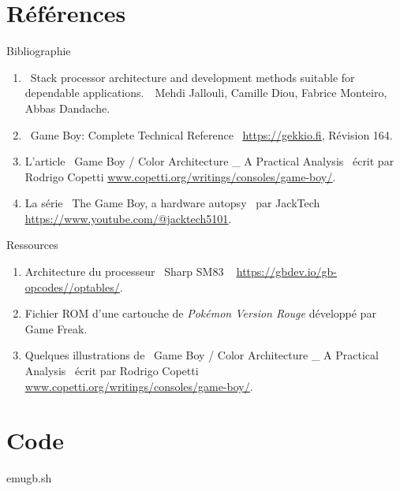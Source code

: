 \documentclass{beamer}
\begin{document}
    \appendix
    \section{Références}
    \begin{frame}{Bibliographie}
        \begin{enumerate}
            \item \guillemotleft\ Stack processor architecture and development methods suitable for dependable
applications.\ \guillemotright\ Mehdi Jallouli, Camille Diou, Fabrice Monteiro, Abbas Dandache.
            \item \guillemotleft\ Game Boy: Complete Technical Reference \guillemotright\ {\color{blue}\underline{\url{https://gekkio.fi}}}, Révision 164.
            \item L'article \guillemotleft\ Game Boy / Color Architecture \_ A Practical Analysis \guillemotright\ écrit par Rodrigo Copetti {\color{blue} \underline{\href{https://www.copetti.org/writings/consoles/game-boy/}{www.copetti.org/writings/consoles/game-boy/}}}.
            \item La série \guillemotleft\ The Game Boy, a hardware autopsy \guillemotright\ par JackTech {\color{blue} \underline{\url{https://www.youtube.com/@jacktech5101}}}.
        \end{enumerate}
    \end{frame}

    \begin{frame}{Ressources}
        \begin{enumerate}
            \item Architecture du processeur \guillemotleft\ Sharp SM83 \guillemotright\ {\color{blue} \underline{\url{https://gbdev.io/gb-opcodes//optables/}}}.
            \item Fichier ROM d'une cartouche de \textit{Pokémon Version Rouge} développé par Game Freak.
            \item Quelques illustrations de \guillemotleft\ Game Boy / Color Architecture \_ A Practical Analysis \guillemotright\ écrit par Rodrigo Copetti {\color{blue} \underline{\href{https://www.copetti.org/writings/consoles/game-boy/}{www.copetti.org/writings/consoles/game-boy/}}}.
        \end{enumerate}
    \end{frame}

    \section{Code}
    \begin{frame}{emugb.sh}
        \lstset{language=bash}
        
    \end{frame}
\end{document}
